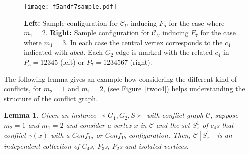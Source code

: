 \documentclass[final]{dmtcs-episciences}
\newtheorem{lemma}[theorem]{Lemma}
\begin{document}
\begin{figure}[t]	   
\begin{center}	   
\texttt{[image: f5andf7sample.pdf]} 
\caption{\sf \textbf{ Left:} Sample configuration for $\mathcal{C}_U$ inducing
$F_5$ for the case where $m_1=2$. 
\textbf{Right:} Sample configuration for $\mathcal{C}_U$ inducing $F_7$ 
for the case where $m_1=3$. In each case 
the central vertex corresponds to the $c_4$  
indicated with $abcd$. 
Each $G_2$ edge is marked with the related $c_4$  in $P_5=12345$ (left) or $P_7=1234567$ (right). 
} 
\label{f5and7sample}	   
\end{center}	   
\end{figure}



The following lemma gives an example how considering the different kind of conflicts, for $m_2=1$ and $m_1=2$, (see Figure~\ref{twoc4}) helps understanding the structure of the conflict graph. 

\begin{lemma}\label{lem:F8}
Given an instance $\prec G_1,G_2,S \succ$ with conflict graph $\mathcal{C}$, suppose $m_2=1$ and $m_1=2$ and consider a vertex $x$ in $\mathcal{C}$ and the set $S_x^1$ of $c_4$s that conflict $\gamma(x)$ with a $Conf_{1a}$ or $Conf_{1b}$ configuration. Then, $\mathcal{C}[S_x^1]$ is an independent collection of $C_4$s, $P_3$s, $P_2$s and isolated vertices.\end{lemma}
\end{document}
